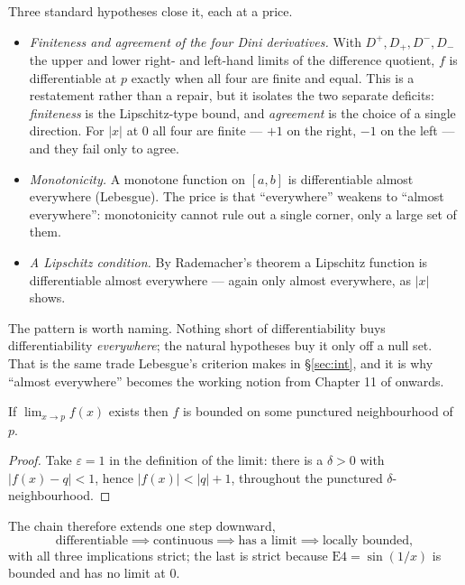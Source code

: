 Three standard hypotheses close it, each at a price.

\begin{itemize}[leftmargin=1.6em, itemsep=2.5pt, topsep=4pt]
  \item \emph{Finiteness and agreement of the four Dini derivatives.} With
        $D^{+}, D_{+}, D^{-}, D_{-}$ the upper and lower right- and
        left-hand limits of the difference quotient, $f$ is differentiable
        at $p$ exactly when all four are finite and equal. This is a
        restatement rather than a repair, but it isolates the two separate
        deficits: \emph{finiteness} is the Lipschitz-type bound, and
        \emph{agreement} is the choice of a single direction. For $|x|$ at
        $0$ all four are finite --- $+1$ on the right, $-1$ on the left ---
        and they fail only to agree.
  \item \emph{Monotonicity.} A monotone function on $[a,b]$ is
        differentiable almost everywhere (Lebesgue). The price is that
        ``everywhere'' weakens to ``almost everywhere'': monotonicity cannot
        rule out a single corner, only a large set of them.
  \item \emph{A Lipschitz condition.} By Rademacher's theorem a Lipschitz
        function is differentiable almost everywhere --- again only almost
        everywhere, as $|x|$ shows.
\end{itemize}

The pattern is worth naming. Nothing short of differentiability buys
differentiability \emph{everywhere}; the natural hypotheses buy it only off a
null set. That is the same trade Lebesgue's criterion makes in
\S\ref{sec:int}, and it is why ``almost everywhere'' becomes the working
notion from Chapter 11 of \cite{rudin} onwards.

\begin{proposition}\label{prop:bdd}
If $\lim_{x\to p}f(x)$ exists then $f$ is bounded on some punctured
neighbourhood of $p$.
\end{proposition}

\begin{proof}
Take $\varepsilon=1$ in the definition of the limit: there is a $\delta>0$ with
$|f(x)-q|<1$, hence $|f(x)|<|q|+1$, throughout the punctured
$\delta$-neighbourhood.
\end{proof}

The chain therefore extends one step downward,
\[ \text{differentiable} \implies \text{continuous} \implies
   \text{has a limit} \implies \text{locally bounded}, \]
with all three implications strict; the last is strict because
$\mathrm{E}4=\sin(1/x)$ is bounded and has no limit at $0$.

